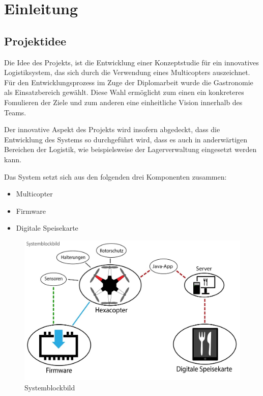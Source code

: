 \chapter{Einleitung}
\renewcommand{\kapitelautor}{Autor: Markus Kaiser}

\section{Projektidee}
Die Idee des Projekts, ist die Entwicklung einer Konzeptstudie für ein innovatives Logistiksystem, das sich durch die Verwendung eines Multicopters auszeichnet.
Für den Entwicklungsprozess im Zuge der Diplomarbeit wurde die Gastronomie als Einsatzbereich gewählt. Diese Wahl ermöglicht zum einen
ein konkreteres Fomulieren der Ziele und zum anderen eine einheitliche Vision innerhalb des Teams.

Der innovative Aspekt des Projekts wird insofern abgedeckt, dass die Entwicklung des Systems so durchgeführt wird,
dass es auch in anderwärtigen Bereichen der Logistik, wie beispielsweise der Lagerverwaltung eingesetzt werden kann.

Das System setzt sich aus den folgenden drei Komponenten zusammen:

\begin{itemize}
  \item Multicopter
  \item Firmware
  \item Digitale Speisekarte
\end{itemize}

\begin{figure}[H]
  \begin{centering}
  \includegraphics[width = 1\textwidth]{Bilder/systemblockbild.jpg}
  \par\end{centering}
  \caption{Systemblockbild}
  \label{Systemblockbild}
\end{figure}

